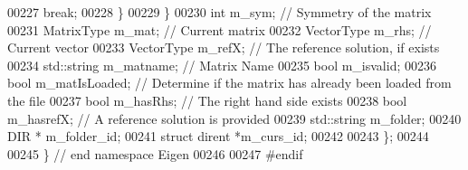 \begin{DoxyCode}
00227         \textcolor{keywordflow}{break}; 
00228       \}
00229     \}
00230     \textcolor{keywordtype}{int} m\_sym; \textcolor{comment}{// Symmetry of the matrix}
00231     MatrixType m\_mat; \textcolor{comment}{// Current matrix  }
00232     VectorType m\_rhs;  \textcolor{comment}{// Current vector}
00233     VectorType m\_refX; \textcolor{comment}{// The reference solution, if exists}
00234     std::string m\_matname; \textcolor{comment}{// Matrix Name}
00235     \textcolor{keywordtype}{bool} m\_isvalid; 
00236     \textcolor{keywordtype}{bool} m\_matIsLoaded; \textcolor{comment}{// Determine if the matrix has already been loaded from the file}
00237     \textcolor{keywordtype}{bool} m\_hasRhs; \textcolor{comment}{// The right hand side exists}
00238     \textcolor{keywordtype}{bool} m\_hasrefX; \textcolor{comment}{// A reference solution is provided}
00239     std::string m\_folder;
00240     DIR * m\_folder\_id;
00241     \textcolor{keyword}{struct }dirent *m\_curs\_id; 
00242     
00243 \};
00244 
00245 \} \textcolor{comment}{// end namespace Eigen}
00246 
00247 \textcolor{preprocessor}{#endif}
\end{DoxyCode}
